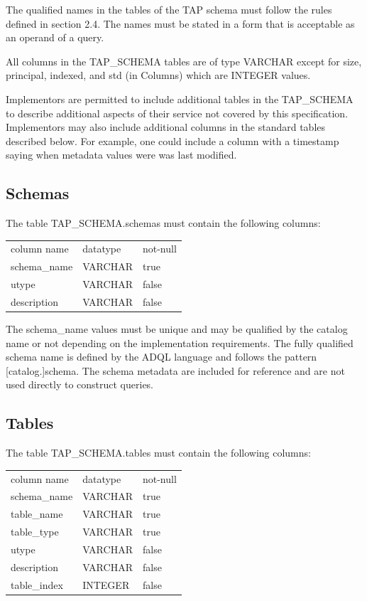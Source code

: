\documentclass[11pt,letter]{ivoa}
\begin{document}
The qualified names in the tables of the TAP schema must follow the rules 
defined in section 2.4. The names must be stated in a form that is acceptable as 
an operand of a query.

All columns in the TAP\_SCHEMA tables are of type VARCHAR except 
for size,  principal, indexed, and std (in Columns) which are INTEGER values.

Implementors are permitted to include additional tables in the 
TAP\_SCHEMA to describe additional aspects of their service not 
covered by this specification. Implementors may also include additional columns 
in the standard tables described below. For example, one could include a column 
with a timestamp saying when metadata values were was last modified.

\subsection{Schemas}
\label{sec:tap-schema-schemas}

The table TAP\_SCHEMA.schemas must contain the following columns:

\begin{tabular}{l l l}
\label{tab:resources}
column name & datatype & not-null \\
schema\_name & VARCHAR & true \\
utype & VARCHAR & false \\
description & VARCHAR & false \\
\end{tabular}

The schema\_name values must be unique and may be qualified by the 
catalog name or not depending on the implementation requirements. The fully 
qualified schema name is defined by the ADQL language and  follows the pattern 
[catalog.]schema. The schema metadata are included for reference and are not 
used directly to construct queries.

\subsection{Tables}
\label{sec:tap-schema-tables}
The table TAP\_SCHEMA.tables must contain the following columns:

\begin{tabular}{l l l}
\label{tab:tap-schema-tables}
column name & datatype & not-null \\
schema\_name & VARCHAR & true \\
table\_name & VARCHAR & true \\
table\_type & VARCHAR & true \\
utype & VARCHAR & false \\
description & VARCHAR & false \\
table\_index & INTEGER & false \\
\end{tabular}
\end{document}
